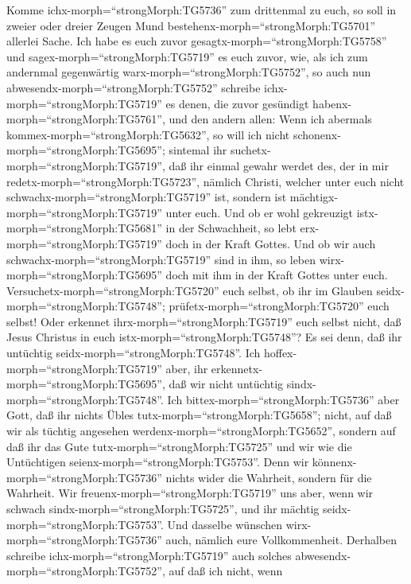  Komme ichx-morph=``strongMorph:TG5736'' zum drittenmal zu
euch, so soll in zweier oder dreier Zeugen Mund
bestehenx-morph=``strongMorph:TG5701'' allerlei Sache.  Ich
habe es euch zuvor gesagtx-morph=``strongMorph:TG5758'' und
sagex-morph=``strongMorph:TG5719'' es euch zuvor, wie, als ich zum
andernmal gegenwärtig warx-morph=``strongMorph:TG5752'', so auch nun
abwesendx-morph=``strongMorph:TG5752'' schreibe
ichx-morph=``strongMorph:TG5719'' es denen, die zuvor gesündigt
habenx-morph=``strongMorph:TG5761'', und den andern allen: Wenn ich
abermals kommex-morph=``strongMorph:TG5632'', so will ich nicht
schonenx-morph=``strongMorph:TG5695'';  sintemal ihr
suchetx-morph=``strongMorph:TG5719'', daß ihr einmal gewahr werdet des,
der in mir redetx-morph=``strongMorph:TG5723'', nämlich Christi, welcher
unter euch nicht schwachx-morph=``strongMorph:TG5719'' ist, sondern ist
mächtigx-morph=``strongMorph:TG5719'' unter euch.  Und ob er
wohl gekreuzigt istx-morph=``strongMorph:TG5681'' in der Schwachheit, so
lebt erx-morph=``strongMorph:TG5719'' doch in der Kraft Gottes. Und ob
wir auch schwachx-morph=``strongMorph:TG5719'' sind in ihm, so leben
wirx-morph=``strongMorph:TG5695'' doch mit ihm in der Kraft Gottes unter
euch.  Versuchetx-morph=``strongMorph:TG5720'' euch selbst,
ob ihr im Glauben seidx-morph=``strongMorph:TG5748'';
prüfetx-morph=``strongMorph:TG5720'' euch selbst! Oder erkennet
ihrx-morph=``strongMorph:TG5719'' euch selbst nicht, daß Jesus Christus
in euch istx-morph=``strongMorph:TG5748''? Es sei denn, daß ihr
untüchtig seidx-morph=``strongMorph:TG5748''.  Ich
hoffex-morph=``strongMorph:TG5719'' aber, ihr
erkennetx-morph=``strongMorph:TG5695'', daß wir nicht untüchtig
sindx-morph=``strongMorph:TG5748''.  Ich
bittex-morph=``strongMorph:TG5736'' aber Gott, daß ihr nichts Übles
tutx-morph=``strongMorph:TG5658''; nicht, auf daß wir als tüchtig
angesehen werdenx-morph=``strongMorph:TG5652'', sondern auf daß ihr das
Gute tutx-morph=``strongMorph:TG5725'' und wir wie die Untüchtigen
seienx-morph=``strongMorph:TG5753''.  Denn wir
könnenx-morph=``strongMorph:TG5736'' nichts wider die Wahrheit, sondern
für die Wahrheit.  Wir freuenx-morph=``strongMorph:TG5719''
uns aber, wenn wir schwach sindx-morph=``strongMorph:TG5725'', und ihr
mächtig seidx-morph=``strongMorph:TG5753''. Und dasselbe wünschen
wirx-morph=``strongMorph:TG5736'' auch, nämlich eure Vollkommenheit.
 Derhalben schreibe ichx-morph=``strongMorph:TG5719'' auch
solches abwesendx-morph=``strongMorph:TG5752'', auf daß ich nicht, wenn
